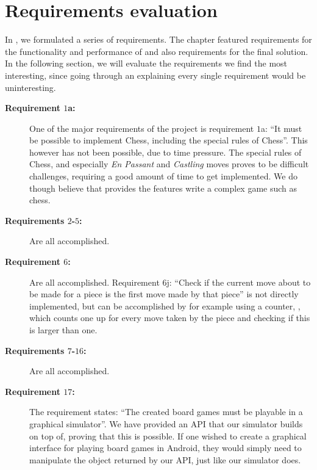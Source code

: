 \section{Requirements evaluation}
\label{sec:requirementsevaluation}

In , we formulated a series of requirements.
The chapter featured requirements for the functionality and performance
of \productname{} and also requirements for the final solution. In the
following section, we will evaluate the requirements we find the most
interesting, since going through an explaining every single requirement
would be uninteresting.

\begin{description}
  \item[\textbf{Requirement $1$a:}]
    One of the major requirements of the project is requirement
    $1$a: ``It must be possible to implement Chess, including the
    special rules of Chess''. This however has not been possible,
    due to time pressure. The special rules of Chess, and especially
    \emph{En Passant} and \emph{Castling} moves proves to be difficult
    challenges, requiring a good amount of time to get implemented. We
    do though believe that \productname{} provides the features write a
    complex game such as chess.

  \item[\textbf{Requirements $2$-$5$:}]
    Are all accomplished.

  \item[\textbf{Requirement $6$:}]
    Are all accomplished. Requirement $6$j: ``Check if the current move
    about to be made for a piece is the first move made by that piece'' is
    not directly implemented, but can be accomplished by for example using a
    counter, , which counts one up for every move taken by
    the piece and checking if this is larger than one.

  \item[\textbf{Requirements $7$-$16$:}]
    Are all accomplished.

  \item[\textbf{Requirement $17$:}]
    The requirement states: ``The created board games must be playable
    in a graphical simulator''. We have provided an API that our
    simulator builds on top of, proving that this is possible. If one
    wished to create a graphical interface for playing board games in
    Android, they would simply need to manipulate the object returned by
    our API, just like our simulator does.


\end{description}
